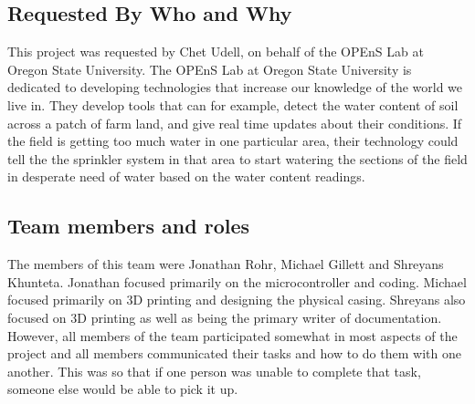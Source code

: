 \documentclass[letterpaper,10pt,draftclsnofoot,onecolumn]{article}
\begin{document}
\subsection{Requested By Who and Why}
This project was requested by Chet Udell, on behalf of the OPEnS Lab at Oregon State University. The OPEnS Lab at Oregon State University is dedicated to developing technologies that increase our knowledge of the world we live in. They develop tools that can for example, detect the water content of soil across a patch of farm land, and give real time updates about their conditions. If the field is getting too much water in one particular area, their technology could tell the the sprinkler system in that area to start watering  the sections of the field in desperate need of water based on the water content readings.

\subsection{Team members and roles}
The members of this team were Jonathan Rohr, Michael Gillett and Shreyans Khunteta.  Jonathan focused primarily on the microcontroller and coding. Michael focused primarily on 3D printing and designing the physical casing. Shreyans also focused on 3D printing as well as being the primary writer of documentation. However, all members of the team participated somewhat in most aspects of the project and all members communicated their tasks and how to do them with one another. This was so that if one person was unable to complete that task, someone else would be able to pick it up. 
\end{document}
